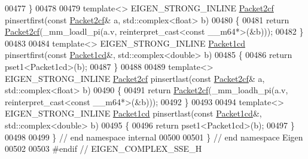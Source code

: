 \begin{DoxyCode}
00477 \}
00478 
00479 \textcolor{keyword}{template}<> EIGEN\_STRONG\_INLINE \hyperlink{struct_eigen_1_1internal_1_1_packet2cf}{Packet2cf} pinsertfirst(\textcolor{keyword}{const} \hyperlink{struct_eigen_1_1internal_1_1_packet2cf}{Packet2cf}& a, 
      std::complex<float> b)
00480 \{
00481   \textcolor{keywordflow}{return} \hyperlink{struct_eigen_1_1internal_1_1_packet2cf}{Packet2cf}(\_mm\_loadl\_pi(a.v, reinterpret\_cast<const \_\_m64*>(&b)));
00482 \}
00483 
00484 \textcolor{keyword}{template}<> EIGEN\_STRONG\_INLINE \hyperlink{struct_eigen_1_1internal_1_1_packet1cd}{Packet1cd} pinsertfirst(\textcolor{keyword}{const} \hyperlink{struct_eigen_1_1internal_1_1_packet1cd}{Packet1cd}&, 
      std::complex<double> b)
00485 \{
00486   \textcolor{keywordflow}{return} pset1<Packet1cd>(b);
00487 \}
00488 
00489 \textcolor{keyword}{template}<> EIGEN\_STRONG\_INLINE \hyperlink{struct_eigen_1_1internal_1_1_packet2cf}{Packet2cf} pinsertlast(\textcolor{keyword}{const} \hyperlink{struct_eigen_1_1internal_1_1_packet2cf}{Packet2cf}& a, 
      std::complex<float> b)
00490 \{
00491   \textcolor{keywordflow}{return} \hyperlink{struct_eigen_1_1internal_1_1_packet2cf}{Packet2cf}(\_mm\_loadh\_pi(a.v, reinterpret\_cast<const \_\_m64*>(&b)));
00492 \}
00493 
00494 \textcolor{keyword}{template}<> EIGEN\_STRONG\_INLINE \hyperlink{struct_eigen_1_1internal_1_1_packet1cd}{Packet1cd} pinsertlast(\textcolor{keyword}{const} \hyperlink{struct_eigen_1_1internal_1_1_packet1cd}{Packet1cd}&, 
      std::complex<double> b)
00495 \{
00496   \textcolor{keywordflow}{return} pset1<Packet1cd>(b);
00497 \}
00498 
00499 \} \textcolor{comment}{// end namespace internal}
00500 
00501 \} \textcolor{comment}{// end namespace Eigen}
00502 
00503 \textcolor{preprocessor}{#endif // EIGEN\_COMPLEX\_SSE\_H}
\end{DoxyCode}
